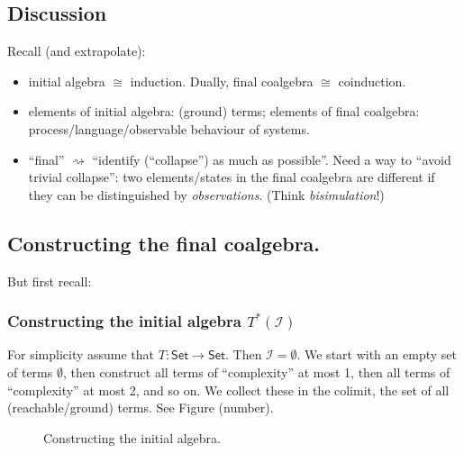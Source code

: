 \documentclass{amsart}
\theoremstyle{definition}
\begin{document}
\subsection{Discussion}
Recall (and extrapolate): 
\begin{itemize}
\item initial algebra $\cong$ induction. Dually, final coalgebra $\cong$ coinduction.
\item elements of initial algebra: (ground) terms; elements of final coalgebra: process/language/observable behaviour of systems.
\item ``final'' $\rightsquigarrow$ ``identify (``collapse'') as much as possible''. Need a way to ``avoid trivial collapse'': two elements/states in the final coalgebra are different if they can be distinguished by \textit{observations}. (Think \textit{bisimulation}!)
\end{itemize}

\subsection{Constructing the final coalgebra.} But first recall:
\subsubsection{Constructing the initial algebra $T^*(\mathcal I)$}
For simplicity assume that $T : \mathsf{Set} \to \mathsf{Set}$. Then $\mathcal I = \emptyset$. We start with an empty set of terms $\emptyset$, then construct all terms of ``complexity'' at most 1, then all terms of ``complexity'' at most 2, and so on. We collect these in the colimit, the set of all (reachable/ground) terms. See Figure (number).

\begin{figure}[ht]
\caption{Constructing the initial algebra.}
\end{figure}
\end{document}

